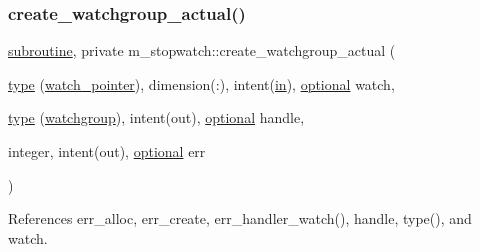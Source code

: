 \subsubsection{\texorpdfstring{create\+\_\+watchgroup\+\_\+actual()}{create\_watchgroup\_actual()}}
{\footnotesize\ttfamily \hyperlink{M__stopwatch_83_8txt_acfbcff50169d691ff02d4a123ed70482}{subroutine}, private m\+\_\+stopwatch\+::create\+\_\+watchgroup\+\_\+actual (\begin{DoxyParamCaption}\item[{\hyperlink{stop__watch_83_8txt_a70f0ead91c32e25323c03265aa302c1c}{type} (\hyperlink{structm__stopwatch_1_1watch__pointer}{watch\+\_\+pointer}), dimension(\+:), intent(\hyperlink{M__journal_83_8txt_afce72651d1eed785a2132bee863b2f38}{in}), \hyperlink{option__stopwatch_83_8txt_aa4ece75e7acf58a4843f70fe18c3ade5}{optional}}]{watch,  }\item[{\hyperlink{stop__watch_83_8txt_a70f0ead91c32e25323c03265aa302c1c}{type} (\hyperlink{structm__stopwatch_1_1watchgroup}{watchgroup}), intent(out), \hyperlink{option__stopwatch_83_8txt_aa4ece75e7acf58a4843f70fe18c3ade5}{optional}}]{handle,  }\item[{integer, intent(out), \hyperlink{option__stopwatch_83_8txt_aa4ece75e7acf58a4843f70fe18c3ade5}{optional}}]{err }\end{DoxyParamCaption})\hspace{0.3cm}{\ttfamily [private]}}



References err\+\_\+alloc, err\+\_\+create, err\+\_\+handler\+\_\+watch(), handle, type(), and watch.

\mbox{\label{namespacem__stopwatch_a703105817c40afaacbda440167c539f4}} 
